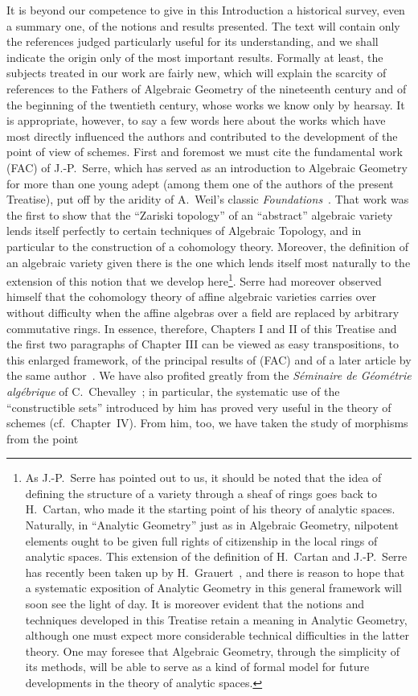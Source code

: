 It is beyond our competence to give in this Introduction a historical survey, even a summary one, of the notions and results presented.
The text will contain only the references judged particularly useful for its understanding, and we shall indicate the origin only of the most important results.
Formally at least, the subjects treated in our work are fairly new, which will explain the scarcity of references to the Fathers of Algebraic Geometry of the nineteenth century and of the beginning of the twentieth century, whose works we know only by hearsay.
It is appropriate, however, to say a few words here about the works which have most directly influenced the authors and contributed to the development of the point of view of schemes.
First and foremost we must cite the fundamental work (FAC) of J.-P.~Serre, which has served as an introduction to Algebraic Geometry for more than one young adept (among them one of the authors of the present Treatise), put off by the aridity of A.~Weil's classic \emph{Foundations}~\cite{I-18}.
That work was the first to show that the ``Zariski topology'' of an ``abstract'' algebraic variety lends itself perfectly to certain techniques of Algebraic Topology, and in particular to the construction of a cohomology theory.
Moreover, the definition of an algebraic variety given there is the one which lends itself most naturally to the extension of this notion that we develop here\footnote{As J.-P.~Serre has pointed out to us, it should be noted that the idea of defining the structure of a variety through a sheaf of rings goes back to H.~Cartan, who made it the starting point of his theory of analytic spaces.
Naturally, in ``Analytic Geometry'' just as in Algebraic Geometry, nilpotent elements ought to be given full rights of citizenship in the local rings of analytic spaces.
This extension of the definition of H.~Cartan and J.-P.~Serre has recently been taken up by H.~Grauert~\cite{I-5}, and there is reason to hope that a systematic exposition of Analytic Geometry in this general framework will soon see the light of day.
It is moreover evident that the notions and techniques developed in this Treatise retain a meaning in Analytic Geometry, although one must expect more considerable technical difficulties in the latter theory.
One may foresee that Algebraic Geometry, through the simplicity of its methods, will be able to serve as a kind of formal model for future developments in the theory of analytic spaces.}.
Serre had moreover observed himself that the cohomology theory of affine algebraic varieties carries over without difficulty when the affine algebras over a field are replaced by arbitrary commutative rings.
In essence, therefore, Chapters I and II of this Treatise and the first two paragraphs of Chapter III can be viewed as easy transpositions, to this enlarged framework, of the principal results of (FAC) and of a later article by the same author~\cite{I-15}.
We have also profited greatly from the \emph{Séminaire de Géométrie algébrique} of C.~Chevalley~\cite{I-1}; in particular, the systematic use of the ``constructible sets'' introduced by him has proved very useful in the theory of schemes (cf.\ Chapter~IV).
From him, too, we have taken the study of morphisms from the point

